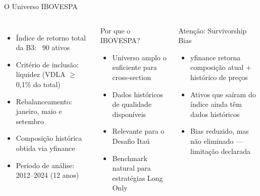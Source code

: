 \documentclass[aspectratio=169,12pt]{beamer}
\begin{document}
\begin{frame}[fragile]{O Universo IBOVESPA}
\begin{columns}[T]
\begin{itemize}
  \item Índice de retorno total da B3: ~90 ativos
  \item Critério de inclusão: liquidez (VDLA $\geq$ 0{,}1\% do total)
  \item Rebalanceamento: janeiro, maio e setembro
  \item Composição histórica obtida via yfinance
  \item Período de análise: 2012--2024 (12 anos)
\end{itemize}
\begin{block}{Por que o IBOVESPA?}
\begin{itemize}
  \item Universo amplo o suficiente para cross-section
  \item Dados históricos de qualidade disponíveis
  \item Relevante para o Desafio Itaú
  \item Benchmark natural para estratégias Long Only
\end{itemize}
\end{block}\vspace{.4em}
\begin{alertblock}{Atenção: Survivorship Bias}
\begin{itemize}
  \item yfinance retorna composição atual + histórico de preços
  \item Ativos que saíram do índice ainda têm dados históricos
  \item Bias reduzido, mas não eliminado — limitação declarada
\end{itemize}
\end{alertblock}
\end{columns}
\end{frame}
\end{document}
